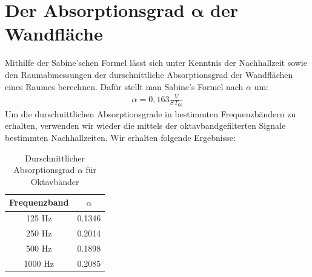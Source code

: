 \section{Der Absorptionsgrad $\mathbf{\alpha}$ der Wandfläche}
\label{sec:alpha}
Mithilfe der Sabine'schen Formel lässt sich unter Kenntnis der Nachhallzeit sowie den Raumabmessungen der durschnittliche Absorptionsgrad der Wandflächen eines Raumes berechnen. 
Dafür stellt man Sabine's Formel nach $\alpha$ um:
\begin{align*}
\alpha = 0,163 \frac{V}{S\,T_{60}}
\end{align*}
Um die durschnittlichen Absorptionsgrade in bestimmten Frequenzbändern zu erhalten, verwenden wir wieder die mittels der oktavbandgefilterten Signale bestimmten Nachhallzeiten. Wir erhalten folgende Ergebnisse:
\begin{table}[H]
    \centering
    \caption{Durschnittlicher Absorptionsgrad $\alpha$ für Oktavbänder}
    \label{tab:alpha}
    \begin{tabular}[\textwidth]{|c|c|}
    \hline
        Frequenzband &  $\alpha$\\
        \hline
        125 Hz & 0.1346 \\
        250 Hz & 0.2014 \\
        500 Hz & 0.1898 \\
        1000 Hz & 0.2085 \\
        \hline
    \end{tabular}
\end{table}


